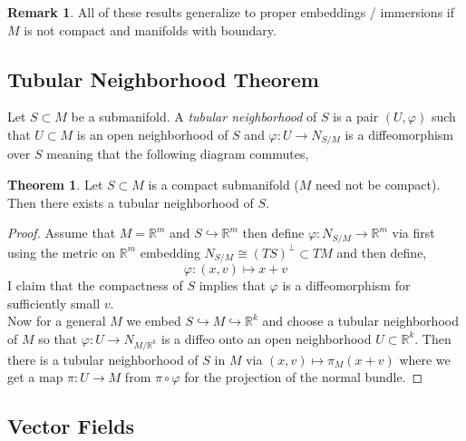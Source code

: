 \documentclass[12pt]{extarticle}
\newcommand{\R}{\mathbb{R}}
\theoremstyle{definition}
\newtheorem{theorem}{Theorem}[section]
\newtheorem{remark}{Remark}
\newenvironment{definition}[1][Definition:]{\begin{trivlist}
\item[\hskip \labelsep {\bfseries #1}]}{\end{trivlist}}
\newcommand{\embed}{\hookrightarrow}
\begin{document}
\begin{remark}
All of these results generalize to proper embeddings / immersions if $M$ is not compact and manifolds with boundary.
\end{remark}

\subsection{Tubular Neighborhood Theorem}

\begin{definition}
Let $S \subset M$ be a submanifold. A \textit{tubular neighborhood} of $S$ is a pair $(U, \varphi)$ such that $U \subset M$ is an open neighborhood of $S$ and $\varphi : U \to N_{S/M}$ is a diffeomorphism over $S$ meaning that the following diagram commutes,
\begin{center}
\end{center} 
\end{definition}

\begin{theorem}
Let $S \subset M$ is a compact submanifold ($M$ need not be compact). Then there exists a tubular neighborhood of $S$.
\end{theorem}

\begin{proof}
Assume that $M = \R^m$ and $S \embed \R^m$ then define $\varphi : N_{S/M} \to \R^m$ via first using the metric on $\R^m$ embedding $N_{S/M} \cong (T S)^\perp \subset TM$ and then define, 
\[ \varphi : (x, v) \mapsto x + v \]
I claim that the compactness of $S$ implies that $\varphi$ is a diffeomorphism for sufficiently small $v$. 
\bigskip\\
Now for a general $M$ we embed $S \embed M \embed \R^k$ and choose a tubular neighborhood of $M$ so that $\varphi : U \to N_{M/\R^k}$ is a diffeo onto an open neighborhood $U \subset \R^k$. Then there is a tubular neighborhood of $S$ in $M$ via $(x, v) \mapsto \pi_M(x+v)$ where we get a map $\pi : U \to M$ from $\pi \circ \varphi$ for the projection of the normal bundle. 
\end{proof} 

\subsection{Vector Fields}
\end{document}
